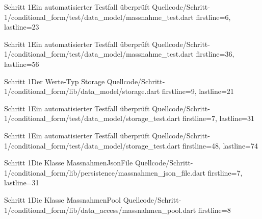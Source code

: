 \begin{alexlisting}{Schritt 1}{Ein automatisierter Testfall überprüft}
  {Quellcode/Schritt-1/conditional_form/test/data_model/massnahme_test.dart}
  {firstline=6, lastline=23}
  \label{lst:MaßnahmeSerialisiertOhneFehlerUnitTest}
\end{alexlisting}

\begin{alexlisting}{Schritt 1}{Ein automatisierter Testfall überprüft}
  {Quellcode/Schritt-1/conditional_form/test/data_model/massnahme_test.dart}
  {firstline=36, lastline=56}
  \label{lst:MaßnahmeDeserialisiertOhneFehlerUnitTest}
\end{alexlisting}





\begin{alexlisting}{Schritt 1}{Der Werte-Typ Storage}
  {Quellcode/Schritt-1/conditional_form/lib/data_model/storage.dart}
  {firstline=9, lastline=21}
  \label{lst:Schritt1WerteTypStorage}
\end{alexlisting}




\begin{alexlisting}{Schritt 1}{Ein automatisierter Testfall überprüft}
  {Quellcode/Schritt-1/conditional_form/test/data_model/storage_test.dart}
  {firstline=7, lastline=31}
  \label{lst:Schritt1MaßnahmenSerialisierenOhneFehlerUnitTest}
\end{alexlisting}



\begin{alexlisting}{Schritt 1}{Ein automatisierter Testfall überprüft}
  {Quellcode/Schritt-1/conditional_form/test/data_model/storage_test.dart}
  {firstline=48, lastline=74}
  \label{lst:Schritt1MaßnahmenDeserialisierenOhneFehlerUnitTest}
\end{alexlisting}





\begin{alexlisting}{Schritt 1}{Die Klasse MassnahmenJsonFile}
  {Quellcode/Schritt-1/conditional_form/lib/persistence/massnahmen_json_file.dart}
  {firstline=7, lastline=31}
  \label{lst:Schritt1KlasseMassnahmenJsonFile}
\end{alexlisting}

\begin{alexlisting}{Schritt 1}{Die Klasse MassnahmenPool}
  {Quellcode/Schritt-1/conditional_form/lib/data_access/massnahmen_pool.dart}
  {firstline=8}
  \label{lst:Schritt1KlasseMassnahmenPool}
\end{alexlisting}















